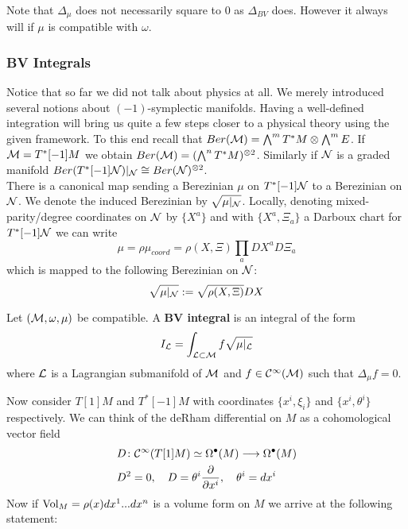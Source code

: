\begin{rem}
  Note that $\Delta_\mu$ does not necessarily square to $0$ as $\Delta_{BV}$ does. However it always will if $\mu$ is compatible with $\omega$.
\end{rem}

\subsubsection{BV Integrals}
Notice that so far we did not talk about physics at all. We merely introduced several notions about $(-1)$-symplectic manifolds. Having a well-defined integration will bring us quite a few steps closer to a physical theory using the given framework. To this end recall that $Ber(\mathcal{M}) = \bigwedge^m T^* M \otimes \bigwedge^m E$. If $\mathcal{M} = T^*[-1] M$ we obtain $Ber(\mathcal{M}) = (\bigwedge^n T^*M)^{\otimes 2}$. Similarly if $\mathcal{N}$ is a graded manifold $Ber(T^*[-1]\mathcal{N})|_{\mathcal{N}} \cong Ber(\mathcal{N})^{\otimes 2}$.\\


There is a canonical map sending a Berezinian $\mu$ on $T^*[-1]\mathcal{N}$ to a Berezinian on $\mathcal{N}$. We denote the induced Berezinian by $\sqrt{\mu|_{\mathcal{N}}}$. Locally, denoting mixed-parity/degree coordinates on $\mathcal{N}$ by $\{X^a\}$ and with $\{X^a, \Xi_a \}$ a Darboux chart for $T^*[-1]\mathcal{N}$ we can write
\begin{equation}
  \mu = \rho \mu_{coord} = \rho(X, \Xi) \prod_a DX^a D\Xi_a
\end{equation}
which is mapped to the following Berezinian on $\mathcal{N}$:
\begin{equation}
  \sqrt{\mu|_{\mathcal{N}}} := \sqrt{\rho(X, \Xi)} DX
\end{equation}

\begin{definition}[BV Integral]
  Let $(\mathcal{M}, \omega, \mu)$ be compatible. A \textbf{BV integral} is an integral of the form
  \begin{equation}
    I_{\mathcal{L}} = \int_{\mathcal{L} \subset \mathcal{M}} f \sqrt{\mu|_{\mathcal{L}}}
  \end{equation}
  where $\mathcal{L}$ is a Lagrangian submanifold of $\mathcal{M}$ and $f \in \mathcal{C}^{\infty}(\mathcal{M})$ such that $\Delta_\mu f = 0$.
\end{definition}

Now consider $T[1]M$ and $T^*[-1]M$ with coordinates $\{x^i, \xi_i \}$ and $\{x^i, \theta^i \}$ respectively. We can think of the deRham differential on $M$ as a cohomological vector field
\begin{align}
  &D \colon \mathcal{C}^{\infty}(T[1]M) \simeq \Omega^\bullet(M) \longrightarrow \Omega^\bullet(M) \\
  &D^2 = 0, \quad D = \theta^i \frac{\partial }{\partial x^i}, \quad \theta^i = dx^i
\end{align}
Now if $\operatorname{Vol}_M = \rho(x) dx^1 ... dx^n$ is a volume form on $M$ we arrive at the following statement:

